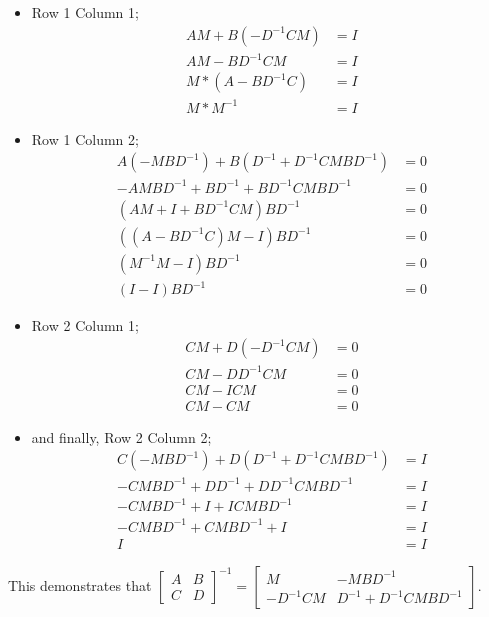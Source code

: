 \documentclass[a4paper, 11pt]{article}
\begin{document}
\begin{itemize}
    \item Row 1 Column 1;
    \begin{align*}
        AM + B(-D^{-1}CM) &= I\\
        AM - BD^{-1}CM &= I\\
        M * (A - BD^{-1}C) &= I\\
        M * M^{-1} &= I
    \end{align*}
    \item Row 1 Column 2;
    \begin{align*}
        A (-MBD^{-1}) + B(D^{-1} + D^{-1}CMBD^{-1}) &= 0 \\
        -AMBD^{-1} +BD^{-1} + BD^{-1}CMBD^{-1} &= 0\\
        (AM + I + BD^{-1}CM)BD^{-1} &= 0\\
        ((A-BD^{-1}C)M - I)BD^{-1} &= 0 \\
        (M^{-1}M - I)BD^{-1} &= 0 \\
        (I - I) BD^{-1} &= 0
    \end{align*}
    \item Row 2 Column 1;
    \begin{align*}
        CM + D(-D^{-1}CM) &= 0 \\
        CM - DD^{-1}CM &= 0 \\
        CM - ICM &= 0\\
        CM - CM &= 0
    \end{align*}
    \item and finally, Row 2 Column 2;
    \begin{align*}
        C(-MBD^{-1}) + D(D^{-1} + D^{-1}CMBD^{-1}) &= I \\
        -CMBD^{-1} +  DD^{-1} + DD^{-1}CMBD^{-1} &= I \\
        -CMBD^{-1} + I + ICMBD^{-1} &= I \\
        -CMBD^{-1} + CMBD^{-1} + I &= I \\
        I &= I
    \end{align*}
\end{itemize}
This demonstrates that $
\begin{bmatrix}
    A & B \\
    C & D
\end{bmatrix}^{-1}
= \begin{bmatrix}
    M & -MBD^{-1} \\
    -D^{-1}CM & D^{-1} + D^{-1}CMBD^{-1}
\end{bmatrix}
    $.
\end{document}
